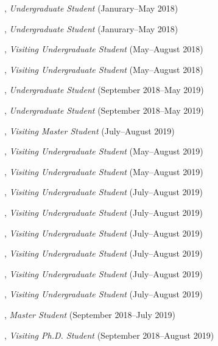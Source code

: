 \documentclass[10pt]{article}
\newenvironment{myindentpar}[1]%
{\begin{list}{}%
         {\setlength{\leftmargin}{#1}}%
         \item[]%
}
{\end{list}}
\newcounter{list}
\begin{document}
\begin{myindentpar}{0.75cm}
	
\hspace{-0.75cm}{\bf Matthew Malir}, \emph{Undergraduate Student} (Janurary--May 2018)
	
\hspace{-0.75cm}{\bf Sebastian Miner}, \emph{Undergraduate Student} (Janurary--May 2018)

\hspace{-0.75cm}{\bf Wenhao Yu}, \emph{Visiting Undergraduate Student} (May--August 2018)

\hspace{-0.75cm}{\bf Yu Shu}, \emph{Visiting Undergraduate Student} (May--August 2018)

\hspace{-0.75cm}{\bf Matthew Schoenbauer}, \emph{Undergraduate Student} (September 2018--May 2019)
	
\hspace{-0.75cm}{\bf Tina Wu}, \emph{Undergraduate Student} (September 2018--May 2019)
	
\hspace{-0.75cm}{\bf Zijian Hu}, \emph{Visiting Master Student} (July--August 2019)

\hspace{-0.75cm}{\bf Yihong Ma}, \emph{Visiting Undergraduate Student} (May--August 2019)

\hspace{-0.75cm}{\bf Chuchen Deng}, \emph{Visiting Undergraduate Student} (May--August 2019)

\hspace{-0.75cm}{\bf Zhihan Zhang}, \emph{Visiting Undergraduate Student} (July--August 2019)

\hspace{-0.75cm}{\bf Xin Liu}, \emph{Visiting Undergraduate Student} (July--August 2019)

\hspace{-0.75cm}{\bf Mengxia Yu}, \emph{Visiting Undergraduate Student} (July--August 2019)

\hspace{-0.75cm}{\bf Wei Peng}, \emph{Visiting Undergraduate Student} (July--August 2019)

\hspace{-0.75cm}{\bf Kaifeng Yu}, \emph{Visiting Undergraduate Student} (July--August 2019)

\hspace{-0.75cm}{\bf Yang Zhou}, \emph{Visiting Undergraduate Student} (July--August 2019)

\hspace{-0.75cm}{\bf Yifan Ding}, \emph{Master Student} (September 2018--July 2019)

\hspace{-0.75cm}{\bf Tianwen Jiang}, \emph{Visiting Ph.D. Student} (September 2018--August 2019)

\end{myindentpar}
\end{document}
